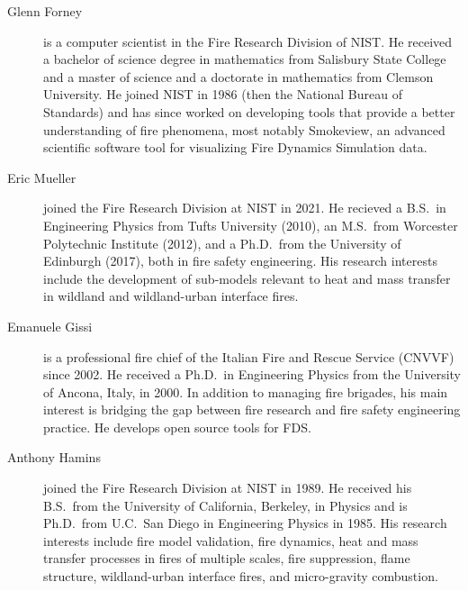 \begin{description}
\item[Glenn Forney] is a computer scientist in the Fire Research Division of NIST.  He received a bachelor of science degree in mathematics from Salisbury State College and a master of science and a doctorate in mathematics from Clemson University.  He joined NIST in 1986 (then the National Bureau of Standards) and has since worked on developing tools that provide a better understanding of fire phenomena, most notably Smokeview, an advanced scientific software tool for visualizing Fire Dynamics Simulation data.

\item[Eric Mueller] joined the Fire Research Division at NIST in 2021. He recieved a B.S.~in Engineering Physics from Tufts University (2010), an M.S.~from Worcester Polytechnic Institute (2012), and a Ph.D.~from the University of Edinburgh (2017), both in fire safety engineering. His research interests include the development of sub-models relevant to heat and mass transfer in wildland and wildland-urban interface fires.



\item[Emanuele Gissi] is a professional fire chief of the Italian Fire and Rescue Service (CNVVF) since 2002. He received a Ph.D.~in Engineering Physics from the University of Ancona, Italy, in 2000. In addition to managing fire brigades, his main interest is bridging the gap between fire research and fire safety engineering practice. He develops open source tools for FDS.

\item[Anthony Hamins] joined the Fire Research Division at NIST in 1989. He received his B.S.~from the University of California, Berkeley, in Physics and is Ph.D.~from U.C.~San Diego in Engineering Physics in 1985.  His research interests include fire model validation, fire dynamics, heat and mass transfer processes in fires of multiple scales, fire suppression, flame structure, wildland-urban interface fires, and micro-gravity combustion.


\end{description}
